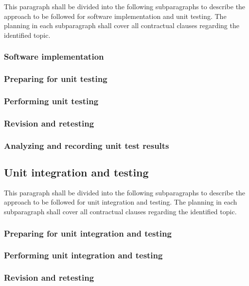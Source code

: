 \documentclass{fidata-report-template}
\begin{document}
This paragraph shall be divided into the following subparagraphs to
describe the approach to be followed for software implementation and
unit testing. The planning in each subparagraph shall cover all
contractual clauses regarding the identified topic.

\subsubsection{Software implementation}

\subsubsection{Preparing for unit testing}

\subsubsection{Performing unit testing}

\subsubsection{Revision and retesting}

\subsubsection{Analyzing and recording unit test results}

\subsection{Unit integration and testing}

This paragraph shall be divided into the following subparagraphs to
describe the approach to be followed for unit integration and testing.
The planning in each subparagraph shall cover all contractual clauses
regarding the identified topic.

\subsubsection{Preparing for unit integration and testing}

\subsubsection{Performing unit integration and testing}

\subsubsection{Revision and retesting}
\end{document}
